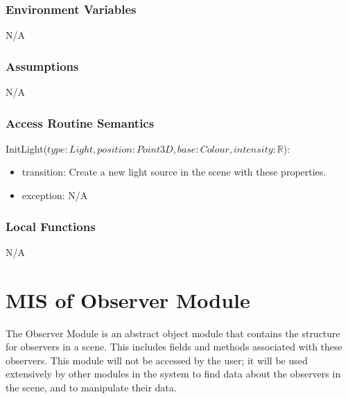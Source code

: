 \documentclass[12pt, titlepage]{article}
\begin{document}
\subsubsection{Environment Variables}
N/A

\subsubsection{Assumptions}
N/A

\subsubsection{Access Routine Semantics}

\noindent InitLight($type: Light, position : Point3D, base : Colour, intensity 
: \mathbb{R}$):
\begin{itemize}
	\item transition: Create a new light source in the scene with these 
	properties.
	\item exception: N/A
\end{itemize}

%

\subsubsection{Local Functions}
N/A

\section{MIS of Observer Module} \label{mObsv} 
The Observer Module is an abstract object module that contains the 
structure for observers in a scene. This includes fields and methods 
associated with these observers. This module will not be accessed by the 
user; it will be used extensively by other modules in the system to find data 
about the observers in the scene, and to manipulate their data.
%
%
\end{document}
